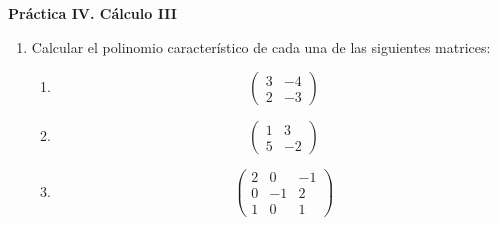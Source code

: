 \documentclass[12pt,letterpaper]{article}
\begin{document}
\begin{center}
    {\Large \bf Práctica IV. Cálculo III}
\end{center}

\begin{enumerate}
  \item Calcular el polinomio característico de cada una de las siguientes matrices:
  \begin{multicols}{3}
    \begin{enumerate}
    \item $$\begin{pmatrix}
      3 & -4\\
      2 & -3
    \end{pmatrix}$$
    \item $$\begin{pmatrix}
      1 & 3\\
      5 & -2
    \end{pmatrix}$$
    \item $$\begin{pmatrix}
      2 & 0 & -1\\
      0 & -1 & 2\\
      1 & 0 & 1
    \end{pmatrix}$$
    \end{enumerate}      
  \end{multicols}
    


\end{enumerate}
\end{document}
